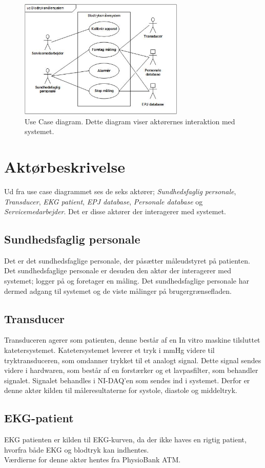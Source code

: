 \begin{figure}[H]
\includegraphics[width =0.7\textwidth , center]{billeder/UseCaseDiagram}
\caption{Use Case diagram. Dette diagram viser aktørernes interaktion med systemet.}
\end{figure}
\section{Aktørbeskrivelse}
Ud fra use case diagrammet ses de seks aktører; \textit{Sundhedsfaglig personale}, \textit{Transducer}, \textit{EKG patient}, \textit{EPJ database}, \textit{Personale database} og \textit{Servicemedarbejder}. Det er disse aktører der interagerer med systemet.
\subsection{Sundhedsfaglig personale}
Det er det sundhedsfaglige personale, der påsætter måleudstyret på patienten. Det sundhedsfaglige personale er desuden den aktør der interagerer med systemet; logger på og foretager en måling. Det sundhedsfaglige personale har dermed adgang til systemet og de viste målinger på brugergrænsefladen.
\subsection{Transducer}
Transduceren agerer som patienten, denne består af en In vitro maskine tilsluttet katetersystemet. Katetersystemet leverer et tryk i mmHg videre til tryktransduceren, som omdanner trykket til et analogt signal. Dette signal sendes videre i hardwaren, som består af en forstærker og et lavpasfilter, som behandler signalet. Signalet behandles i NI-DAQ'en som sendes ind i systemet. Derfor er denne aktør kilden til måleresultaterne for systole, diastole og middeltryk.
\subsection{EKG-patient}
EKG patienten er kilden til EKG-kurven, da der ikke haves en rigtig patient, hvorfra både EKG og blodtryk kan indhentes.\\
Værdierne for denne aktør hentes fra PhysioBank ATM.
